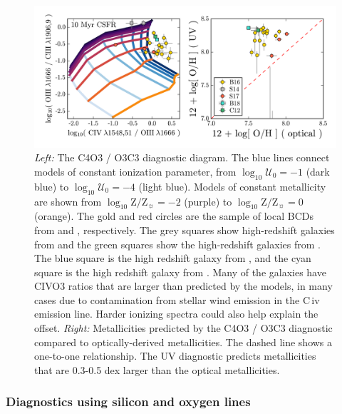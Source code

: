 \documentclass[preprint2]{aastex62}
\newcommand{\civ}{C\,{\sc iv}\xspace}
\newcommand{\logten}{\ensuremath{\log_{10}}}
\newcommand{\logZeq}[1]{\ensuremath{\logten \mathrm{Z}/\mathrm{Z}_{\sun} = #1}}
\newcommand{\logUeq}[1]{\ensuremath{\logten \mathcal{U}_0 = #1}}
\begin{document}
\begin{figure}
  \begin{center}
    \includegraphics[width=\linewidth]{figs/af4.png}
    \caption{\emph{Left:} The C4O3 / O3C3 diagnostic diagram. The blue lines connect models of constant ionization parameter, from \logUeq{-1} (dark blue) to \logUeq{-4} (light blue). Models of constant metallicity are shown from \logZeq{-2} (purple) to \logZeq{0} (orange). The gold and red circles are the sample of local BCDs from \citet{Berg+2016} and \citet{Senchyna+2017}, respectively. The grey squares show high-redshift galaxies from \citet{Stark+2014} and the green squares show the high-redshift galaxies from \citet{Rigby+2018b}. The blue square is the high redshift galaxy from \citet{Christensen+2012}, and the cyan square is the high redshift galaxy from \citet{Berg+2018}. Many of the galaxies have CIVO3 ratios that are larger than predicted by the models, in many cases due to contamination from stellar wind emission in the \civ emission line. Harder ionizing spectra could also help explain the offset. \emph{Right:} Metallicities predicted by the C4O3 / O3C3 diagnostic compared to optically-derived metallicities. The dashed line shows a one-to-one relationship. The UV diagnostic predicts metallicities that are 0.3-0.5 dex larger than the optical metallicities.}
    \label{fig:UVCIV}
  \end{center}
\end{figure}

\subsubsection{Diagnostics using silicon and oxygen lines}\label{sec:ZZ:UVOpt:Si}
\end{document}
